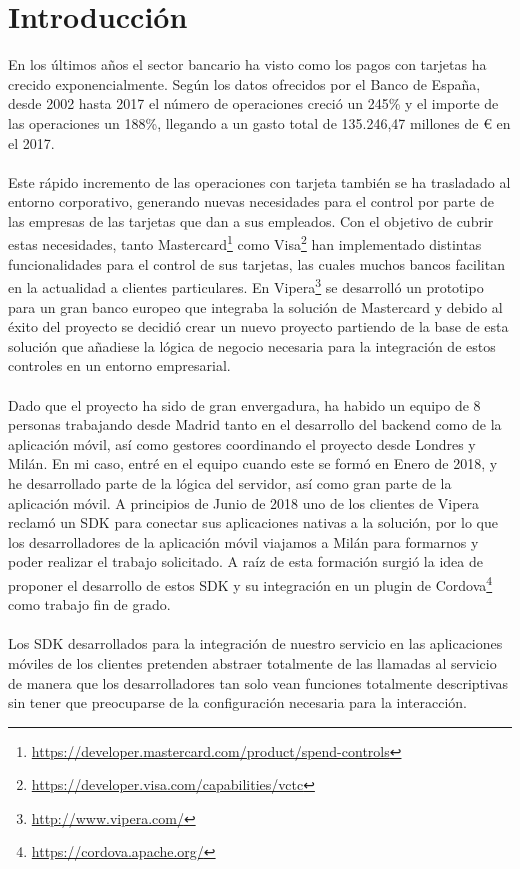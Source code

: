\documentclass[a4paper, 12pt]{article}
\begin{document}
\newpage
{}%

\section{Introducción}
\label{sec-1}
En los últimos años el sector bancario ha visto como los pagos con tarjetas ha crecido exponencialmente.
Según los datos ofrecidos por el Banco de España, desde 2002 hasta 2017 el número de operaciones creció
un 245\% y el importe de las operaciones un 188\%, llegando a un gasto total de 135.246,47 millones de €
en el 2017\cite{BancoEspana}.
\\
\\
Este rápido incremento de las operaciones con tarjeta también se ha trasladado al entorno corporativo,
generando nuevas necesidades para el control por parte de las empresas de las tarjetas que dan a sus
empleados. Con el objetivo de cubrir estas necesidades, tanto Mastercard\footnote{\url{https://developer.mastercard.com/product/spend-controls}} como Visa\footnote{\url{https://developer.visa.com/capabilities/vctc}} han implementado distintas funcionalidades para el control de sus tarjetas,
las cuales muchos bancos facilitan en la actualidad a clientes particulares. En Vipera\footnote{\url{http://www.vipera.com/}} se desarrolló un prototipo para un gran banco europeo que integraba
la solución de Mastercard y debido al éxito del proyecto se decidió crear un nuevo proyecto partiendo de la base de esta solución que añadiese la lógica de negocio
necesaria para la integración de estos controles en un entorno empresarial.
\\
\\
Dado que el proyecto ha sido de gran envergadura, ha habido un equipo de 8 personas trabajando desde Madrid tanto en el desarrollo del backend como de la aplicación móvil,
así como gestores coordinando el proyecto desde Londres y Milán. En mi caso, entré en el equipo cuando este se formó en Enero de 2018, y he desarrollado parte de la lógica del servidor,
así como gran parte de la aplicación móvil. A principios de Junio de 2018 uno de los clientes de Vipera reclamó un SDK para conectar sus aplicaciones nativas a la solución, por lo que los
desarrolladores de la aplicación móvil viajamos a Milán para formarnos y poder realizar el trabajo solicitado. A raíz de esta formación surgió la idea de proponer el desarrollo de estos SDK y su
integración en un plugin de Cordova\footnote{\url{https://cordova.apache.org/}} como trabajo fin de grado.
\\
\\
Los SDK desarrollados para la integración de nuestro servicio en las aplicaciones móviles de los clientes
pretenden abstraer totalmente de las llamadas al servicio de manera que los desarrolladores tan solo
vean funciones totalmente descriptivas sin tener que preocuparse de la configuración necesaria para la
interacción.
\end{document}
